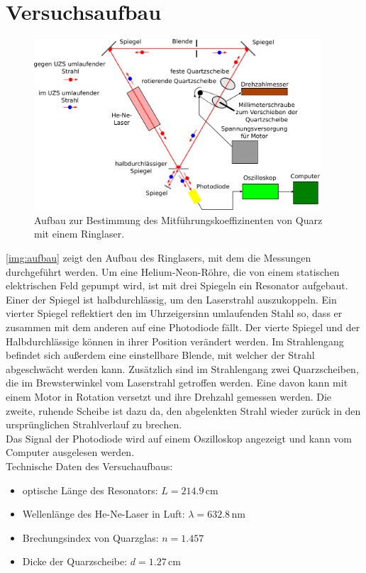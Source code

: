 \section{Versuchsaufbau}
\label{sec:aufbau}

\begin{figure}[H]
\begin{center}
  \includegraphics[width=0.95\textwidth]{../img/aufbau.pdf}
  \caption{Aufbau zur Bestimmung des Mitführungskoeffizinenten von Quarz mit einem Ringlaser.}
  \label{img:aufbau}
\end{center}
\end{figure}
\autoref{img:aufbau} zeigt den Aufbau des Ringlasers,
mit dem die Messungen durchgeführt werden.
Um eine Helium-Neon-Röhre,
die von einem statischen elektrischen Feld gepumpt wird,
ist mit drei Spiegeln ein Resonator aufgebaut.
Einer der Spiegel ist halbdurchlässig, um den Laserstrahl auszukoppeln.
Ein vierter Spiegel reflektiert den im Uhrzeigersinn umlaufenden Stahl so,
dass er zusammen mit dem anderen auf eine Photodiode fällt.
Der vierte Spiegel und der Halbdurchlässige können in ihrer Position verändert werden.
Im Strahlengang befindet sich außerdem eine einstellbare Blende,
mit welcher der Strahl abgeschwächt werden kann.
Zusätzlich sind im Strahlengang zwei Quarzscheiben,
die im Brewsterwinkel vom Laserstrahl getroffen werden.
Eine davon kann mit einem Motor in Rotation versetzt und ihre Drehzahl gemessen werden.
Die zweite, ruhende Scheibe ist dazu da,
den abgelenkten Strahl wieder zurück in den ursprünglichen Strahlverlauf zu brechen.\\
Das Signal der Photodiode wird auf einem Oszilloskop angezeigt und kann
vom Computer ausgelesen werden. \\[\baselineskip]
Technische Daten des Versuchaufbaus:
\begin{itemize}
  \item optische Länge des Resonators: $L = 214.9$\,cm
  \item Wellenlänge des He-Ne-Laser in Luft: $\lambda = 632.8$\,nm
  \item Brechungsindex von Quarzglas: $n = 1.457$
  \item Dicke der Quarzscheibe: $d = 1.27$\,cm
\end{itemize}